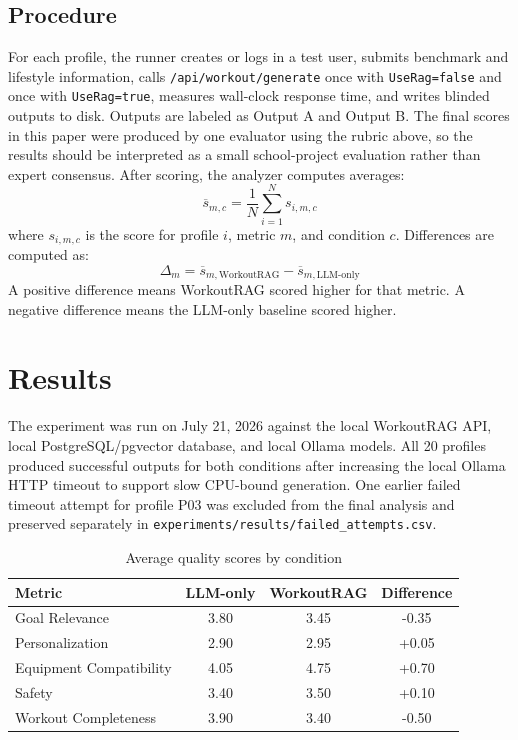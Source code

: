 \documentclass[12pt]{article}
\begin{document}
\subsection{Procedure}
For each profile, the runner creates or logs in a test user, submits benchmark and lifestyle information, calls \texttt{/api/workout/generate} once with \texttt{UseRag=false} and once with \texttt{UseRag=true}, measures wall-clock response time, and writes blinded outputs to disk. Outputs are labeled as Output A and Output B. The final scores in this paper were produced by one evaluator using the rubric above, so the results should be interpreted as a small school-project evaluation rather than expert consensus. After scoring, the analyzer computes averages:
\[
\overline{s}_{m,c} = \frac{1}{N}\sum_{i=1}^{N}s_{i,m,c}
\]
where \(s_{i,m,c}\) is the score for profile \(i\), metric \(m\), and condition \(c\). Differences are computed as:
\[
\Delta_m = \overline{s}_{m,\text{WorkoutRAG}} - \overline{s}_{m,\text{LLM-only}}
\]
A positive difference means WorkoutRAG scored higher for that metric. A negative difference means the LLM-only baseline scored higher.

\section{Results}
The experiment was run on July 21, 2026 against the local WorkoutRAG API, local PostgreSQL/pgvector database, and local Ollama models. All 20 profiles produced successful outputs for both conditions after increasing the local Ollama HTTP timeout to support slow CPU-bound generation. One earlier failed timeout attempt for profile P03 was excluded from the final analysis and preserved separately in \texttt{experiments/results/failed\_attempts.csv}.

\begin{table}[h]
\centering
\caption{Average quality scores by condition}
\begin{tabular}{lccc}
\toprule
Metric & LLM-only & WorkoutRAG & Difference \\
\midrule
Goal Relevance & 3.80 & 3.45 & -0.35 \\
Personalization & 2.90 & 2.95 & +0.05 \\
Equipment Compatibility & 4.05 & 4.75 & +0.70 \\
Safety & 3.40 & 3.50 & +0.10 \\
Workout Completeness & 3.90 & 3.40 & -0.50 \\
\bottomrule
\end{tabular}
\end{table}
\end{document}
